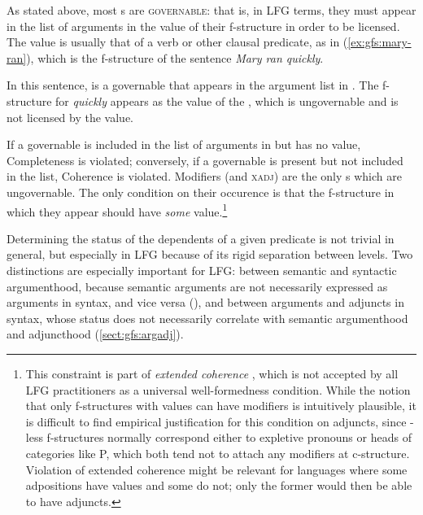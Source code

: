 \documentclass[output=paper]{../langscibook}
\begin{document}
 As stated above, most {\GF}s are \textsc{governable}: that is, in LFG terms, they must appear in the list of arguments in the \PRED value of their f-structure in order to be licensed. The \PRED value is usually that of a verb or other clausal predicate, as in (\ref{ex:gfs:mary-ran}), which is the f-structure of the sentence \textit{Mary ran quickly}.
 
 
 \noindent In this sentence, \SUBJ is a governable \GF that appears in the argument list in \PRED. The f-structure for \emph{quickly} appears as the value of the \GF \ADJ, which is ungovernable and is not licensed by the \PRED value.
 
 If a governable \GF is included in the list of arguments in \PRED but has no value, Completeness is violated; conversely, if a governable \GF is present but not included in the list, Coherence is violated. Modifiers (\ADJ and \textsc{xadj}) are the only {\GF}s which are ungovernable. The only condition on their occurence is that the f-structure in which they appear should have \textit{some} \PRED value.\footnote{This constraint is part of \textit{extended coherence} \citep{BresnanEtAl2016}, which is not accepted by all LFG practitioners as a universal well-formedness condition. While the notion that only f-structures with \PRED values can have modifiers is intuitively plausible, it is difficult to find empirical justification for this condition on adjuncts, since \PRED-less f-structures normally correspond either to expletive pronouns or heads of categories like P, which both tend not to attach any modifiers at c-structure. Violation of extended coherence might be relevant for languages where some adpositions have \PRED values and some do not; only the former would then be able to have adjuncts.}
 
 Determining the status of the dependents of a given predicate is not trivial in general, but especially in LFG because of its rigid separation between levels. Two distinctions are especially important for LFG: between semantic and syntactic argumenthood, because semantic arguments are not necessarily expressed as arguments in syntax, and vice versa (), and between arguments and adjuncts in syntax, whose status does not necessarily correlate with semantic argumenthood and adjuncthood (\ref{sect:gfs:argadj}).
 
\end{document}
